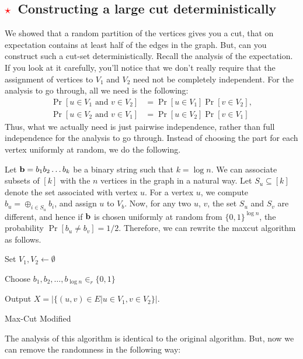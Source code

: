 \subsection{\textcolor{red}{$\star$}~Constructing a large cut deterministically}

We showed that a random partition of the vertices gives you a cut, that on expectation contains at least half of the edges in the graph. But, can you construct such a cut-set deterministically. Recall the analysis of the expectation. If you look at it carefully, you'll notice that we don't really require that the assignment of vertices to $V_1$ and $V_2$ need not be completely independent. For the analysis to go through, all we need is the following:
\begin{align*}
	\Pr[u \in V_1 \text{ and } v\in V_2] &= \Pr[u \in V_1] \Pr[v \in V_2], \\
	\Pr[u \in V_2 \text{ and } v\in V_1] &= \Pr[u \in V_2] \Pr[v \in V_1]
\end{align*}
Thus, what we actually need is just pairwise independence, rather than full independence for the analysis to go through. Instead of choosing the part for each vertex uniformly at random, we do the following.

Let $\mathbf{b} = b_1b_2\ldots b_k$ be a binary string such that $k=\log n$. We can associate subsets of $[k]$ with the $n$ vertices in the graph in a natural way. Let $S_u \subseteq [k]$ denote the set associated with vertex $u$. For a vertex $u$, we compute $b_u = \oplus_{i\in S_u} b_i$, and assign $u$ to $V_b$. Now, for any two $u$, $v$, the set $S_u$ and $S_v$ are different, and hence if $\mathbf{b}$ is chosen uniformly at random from $\{0,1\}^{\log n}$, the probability $\Pr[b_u \neq b_v] = 1/2$. Therefore, we can rewrite the maxcut algorithm as follows.

\begin{algorithm}
	
	Set $V_1, V_2 \gets \emptyset$
	
	Choose $b_1, b_2, \ldots, b_{\log n} \in_r \{0,1\}$
		
	
	Output $X = |\{(u,v)\in E | u\in V_1, v\in V_2 \}|$.
	\caption{Max-Cut Modified}
	\label{alg:maxcut-modified}
\end{algorithm}

The analysis of this algorithm is identical to the original algorithm. But, now we can remove the randomness in the following way:

